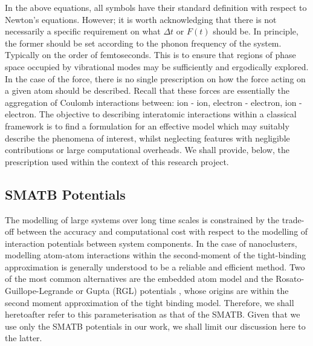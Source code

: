 In the above equations, all symbols have their standard definition with respect to Newton's equations. However; it is worth acknowledging that there is not necessarily a specific requirement on what $\Delta t$ or $F(t)$ should be. In principle, the former should be set according to the phonon frequency of the system. Typically on the order of femtoseconds. This is to ensure that regions of phase space occupied by vibrational modes may be sufficiently and ergodically explored. In the case of the force, there is no single prescription on how the force acting on a given atom should be described. Recall that these forces are essentially the aggregation of Coulomb interactions between: ion - ion, electron - electron, ion - electron. The objective to describing interatomic interactions within a classical framework is to find a formulation for an effective model which may suitably describe the phenomena of interest, whilst neglecting features with negligible contributions or large computational overheads. We shall provide, below, the prescription used within the context of this research project.


\subsection{SMATB Potentials}
The modelling of large systems over long time scales is constrained by the trade-off between the accuracy and computational cost with respect to the modelling of interaction potentials between system components. In the case of nanoclusters, modelling atom-atom interactions within the second-moment of the tight-binding approximation is generally understood to be a reliable and efficient method. Two of the most common alternatives are the embedded atom model and the Rosato-Guillope-Legrande or Gupta (RGL) potentials \cite{RGL}, whose origins are within the second moment approximation of the tight binding model. Therefore, we shall heretoafter refer to this parameterisation as that of the SMATB. Given that we use only the SMATB potentials in our work, we shall limit our discussion here to the latter. 

